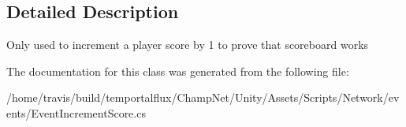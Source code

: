 \subsection{Detailed Description}
Only used to increment a player score by 1 to prove that scoreboard works 



The documentation for this class was generated from the following file\-:\begin{DoxyCompactItemize}
\item 
/home/travis/build/temportalflux/\-Champ\-Net/\-Unity/\-Assets/\-Scripts/\-Network/events/Event\-Increment\-Score.\-cs\end{DoxyCompactItemize}
